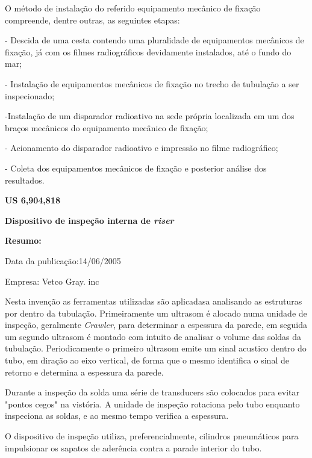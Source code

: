 \documentclass[a4paper,12pt]{article}
\begin{document}
O método de instalação do referido equipamento mecânico de fixação
compreende, dentre outras, as seguintes etapas:

- Descida de uma cesta contendo uma pluralidade de equipamentos
mecânicos de fixação, já com os filmes radiográficos devidamente
instalados, até o fundo do mar;

- Instalação de equipamentos mecânicos de fixação no trecho de
tubulação a ser inspecionado;

-Instalação de um disparador radioativo na sede própria localizada
em um dos braços mecânicos do equipamento mecânico de fixação;

- Acionamento do disparador radioativo e impressão no filme
radiográfico;

- Coleta dos equipamentos mecânicos de fixação e posterior análise
dos resultados.



\vspace{1,0cm}
 \begin{center}
  \textbf{US 6,904,818} 
 
 \textbf{Dispositivo de inspeção interna de \textit{riser}}
 \end{center}
 
  \textbf{Resumo:}
 
 Data da publicação:14/06/2005
 
 Empresa: Vetco Gray. inc
 
 \vspace{1,0cm}
 
 Nesta invenção as ferramentas utilizadas são aplicadasa analisando as estruturas por dentro da tubulação. Primeiramente um ultrasom é alocado numa unidade de inspeção, geralmente \textit{Crawler}, para determinar a espessura da parede, em seguida um segundo ultrasom é montado com intuito de analisar o volume das soldas da tubulação. Periodicamente o primeiro ultrasom emite um sinal acustico dentro do tubo, em diração ao eixo vertical, de forma que o mesmo identifica o sinal de retorno e determina a espessura da parede.
 

 Durante a inspeção da solda uma série de transducers são colocados para evitar "pontos cegos" na vistória. A unidade de inspeção rotaciona pelo tubo enquanto inspeciona as soldas, e ao mesmo tempo verifica a espessura.
 
 O dispositivo de inspeção utiliza, preferencialmente, cilindros pneumáticos para impulsionar os sapatos de aderência contra a parade interior do tubo.
\end{document}
